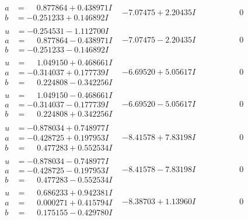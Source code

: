 \documentclass[1p]{elsarticle_modified}
\theoremstyle{definition}
\begin{document}
$$\begin{array}{c|c|c}
\begin{aligned}
a &= \phantom{-}0.877864 + 0.438971 I \\
b &= -0.251233 + 0.146892 I\end{aligned}
 & -7.07475 + 2.20435 I & \phantom{-0.000000 } 0 \\ \hline\begin{aligned}
u &= -0.254531 - 1.112700 I \\
a &= \phantom{-}0.877864 - 0.438971 I \\
b &= -0.251233 - 0.146892 I\end{aligned}
 & -7.07475 - 2.20435 I & \phantom{-0.000000 } 0 \\ \hline\begin{aligned}
u &= \phantom{-}1.049150 + 0.468661 I \\
a &= -0.314037 + 0.177739 I \\
b &= \phantom{-}0.224808 - 0.342256 I\end{aligned}
 & -6.69520 + 5.05617 I & \phantom{-0.000000 } 0 \\ \hline\begin{aligned}
u &= \phantom{-}1.049150 - 0.468661 I \\
a &= -0.314037 - 0.177739 I \\
b &= \phantom{-}0.224808 + 0.342256 I\end{aligned}
 & -6.69520 - 5.05617 I & \phantom{-0.000000 } 0 \\ \hline\begin{aligned}
u &= -0.878034 + 0.748977 I \\
a &= -0.428725 + 0.197953 I \\
b &= \phantom{-}0.477283 + 0.552534 I\end{aligned}
 & -8.41578 + 7.83198 I & \phantom{-0.000000 } 0 \\ \hline\begin{aligned}
u &= -0.878034 - 0.748977 I \\
a &= -0.428725 - 0.197953 I \\
b &= \phantom{-}0.477283 - 0.552534 I\end{aligned}
 & -8.41578 - 7.83198 I & \phantom{-0.000000 } 0 \\ \hline\begin{aligned}
u &= \phantom{-}0.686233 + 0.942381 I \\
a &= \phantom{-}0.000271 + 0.415794 I \\
b &= \phantom{-}0.175155 - 0.429780 I\end{aligned}
 & -8.38703 + 1.13960 I & \phantom{-0.000000 } 0 \\ \hline\begin{aligned}

\end{aligned}
\end{array}$$
\end{document}
